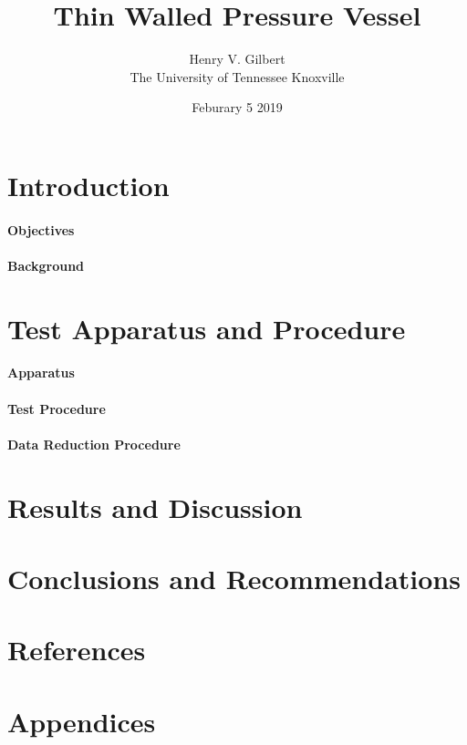 \documentclass{article}
\title{Thin Walled Pressure Vessel}
\author{Henry V. Gilbert \\
	The University of Tennessee Knoxville \\
	}
\date{Feburary 5 2019}
\begin{document}
\maketitle
\newpage





\section{Introduction}
\paragraph{Objectives}
\paragraph{Background} 

\section{Test Apparatus and Procedure}
\paragraph {Apparatus}
\paragraph{Test Procedure} 
\paragraph {Data Reduction Procedure } 

\section{Results and Discussion}\label{conclusions}


\section {Conclusions and Recommendations}



\section {References} 


\section {Appendices} 
\end{document}
